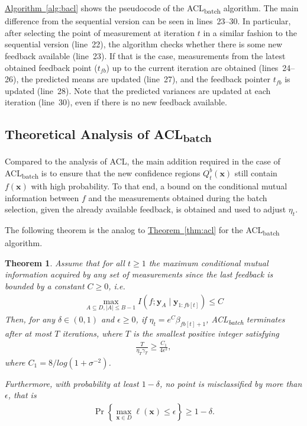 \documentclass{article}
\def\*#1{\bm{#1}}
\newcommand{\algoref}[1]{\hyperref[#1]{\mbox{Algorithm~\ref*{#1}}}}
\newcommand{\theoremref}[1]{\hyperref[#1]{\mbox{Theorem~\ref*{#1}}}}
\newtheorem{theorem}{Theorem}
\newcommand{\acl}{\textsf{ACL}\xspace}
\newcommand{\bacl}{\textsf{ACL\textsubscript{batch}}\xspace}
\begin{document}
\algoref{alg:bacl} shows the pseudocode of the \bacl algorithm. The main
difference from the sequential version can be seen in lines~23--30.
In particular, after selecting the point of measurement at iteration $t$
in a similar fashion to the sequential version (line~22), the algorithm
checks whether there is some new feedback available (line~23). If that
is the case, measurements from the latest obtained feedback point ($t_{fb}$)
up to the current iteration are obtained (lines~24--26), the predicted
means are updated (line~27), and the feedback pointer $t_{fb}$
is updated (line~28). Note that the predicted variances are updated at
each iteration (line~30), even if there is no new feedback available.

\subsection{Theoretical Analysis of \bacl}
Compared to the analysis of \acl, the main addition required in the case of
\bacl is to ensure that the new confidence regions $Q_t^b(\*x)$ still
contain $f(\*x)$ with high probability. To that end, a bound on the
conditional mutual information between $f$ and the measurements
obtained during the batch selection, given the already available feedback,
is obtained and used to adjust $\eta_t$.

The following theorem is the analog to \theoremref{thm:acl} for the
\bacl algorithm.

\begin{theorem}
\label{thm:bacl}
Assume that for all $t \geq 1$ the maximum conditional mutual information
acquired by any set of measurements since the last feedback is bounded
by a constant $C \geq 0$, i.e.
\begin{align*}
\max_{A\subseteq D, |A|\leq B-1} I(f; \*y_A \mid \*y_{1:fb[t]}) \leq C
\end{align*}
Then, for any $\delta \in (0, 1)$ and $\epsilon \geq 0$,
if $\eta_t = e^C\beta_{fb[t]+1}$, \bacl terminates after
at most $T$ iterations, where $T$ is the smallest positive integer
satisfying
\begin{align*}
\frac{T}{\eta_T \gamma_T} \geq \frac{C_1}{4\epsilon^2},
\end{align*}
where $C_1 = 8/log(1 + \sigma^{-2})$.

Furthermore, with probability at least $1-\delta$, no point is
misclassified by more than $\epsilon$, that is
\begin{align*}
\Pr\left\{\max_{\*x\in D}\ell(\*x) \leq \epsilon\right\} \geq 1 - \delta.
\end{align*}
\end{theorem}
\end{document}
